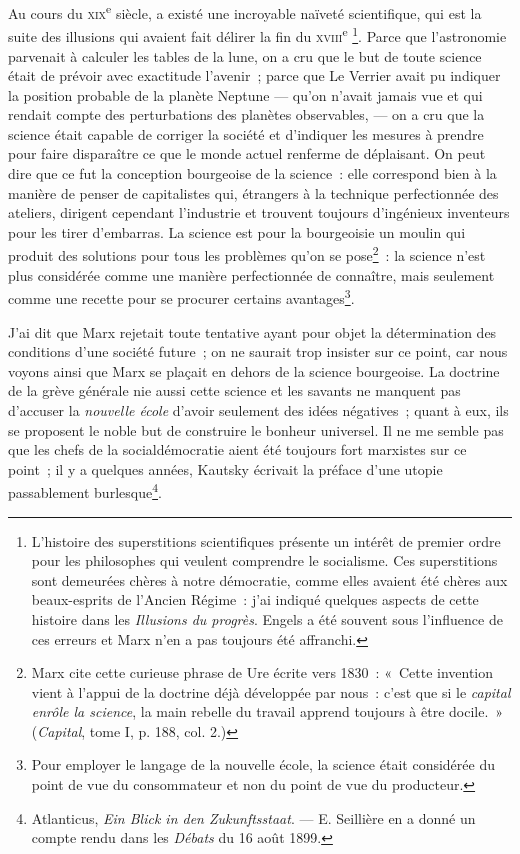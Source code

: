 \documentclass[french,twoside]{book} %
\begin{document}
Au cours du {\scshape xix}\textsuperscript{e} siècle, a existé une incroyable naïveté  scientifique, qui est la suite des illusions qui avaient fait délirer la fin du {\scshape xviii}\textsuperscript{e} \footnote{ \noindent L’histoire des superstitions scientifiques présente un intérêt de premier ordre pour les philosophes qui veulent comprendre le socialisme. Ces superstitions sont demeurées chères à notre démocratie, comme elles avaient été chères aux beaux-esprits de l’Ancien Régime : j’ai indiqué quelques aspects de cette histoire dans les \emph{Illusions du progrès}. Engels a été souvent sous l’influence de ces erreurs et Marx n’en a pas toujours été affranchi.
 }. Parce que l’astronomie parvenait à calculer les tables de la lune, on a cru que le but de toute science était de prévoir avec exactitude l’avenir ; parce que Le Verrier avait pu indiquer la position probable de la planète Neptune — qu’on n’avait jamais vue et qui rendait compte des perturbations des planètes observables, — on a cru que la science était capable de corriger la société et d’indiquer les mesures à prendre pour faire disparaître ce que le monde actuel renferme de déplaisant. On peut dire que ce fut la conception bourgeoise de la science : elle correspond bien à la manière de penser de capitalistes qui, étrangers à la technique perfectionnée des ateliers, dirigent cependant l’industrie et trouvent toujours d’ingénieux inventeurs pour les tirer d’embarras. La science est pour la bourgeoisie un moulin qui produit des solutions pour tous les problèmes qu’on se pose\footnote{ \noindent Marx cite cette curieuse phrase de Ure écrite vers 1830 : « Cette invention vient à l’appui de la doctrine déjà développée par nous : c’est que si le \emph{capital enrôle la science}, la main rebelle du travail apprend toujours à être docile. » (\emph{Capital}, tome I, p. 188, col. 2.)
 } : la science n’est plus considérée comme une manière perfectionnée de connaître,  mais seulement comme une recette pour se procurer certains avantages\footnote{ \noindent Pour employer le langage de la nouvelle école, la science était considérée du point de vue du consommateur et non du point de vue du producteur.
 }.\par
J’ai dit que Marx rejetait toute tentative ayant pour objet la détermination des conditions d’une société future ; on ne saurait trop insister sur ce point, car nous voyons ainsi que Marx se plaçait en dehors de la science bourgeoise. La doctrine de la grève générale nie aussi cette science et les savants ne manquent pas d’accuser la \emph{nouvelle école} d’avoir seulement des idées négatives ; quant à eux, ils se proposent le noble but de construire le bonheur universel. Il ne me semble pas que les chefs de la socialdémocratie aient été toujours fort marxistes sur ce point ; il y a quelques années, Kautsky écrivait la préface d’une utopie passablement burlesque\footnote{ \noindent Atlanticus, \emph{Ein Blick in den Zukunftsstaat}. — E. Seillière en a donné un compte rendu dans les \emph{Débats} du 16 août 1899.
 }.\par
\end{document}
